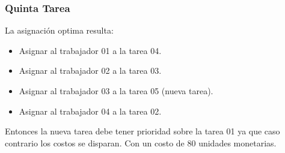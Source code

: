 \begin{homeworkProblem}[-1][JoShop]
\subsubsection{Quinta Tarea}
La asignación optima resulta:
\begin{itemize}
    \item Asignar al trabajador 01 a la tarea 04.
    \item Asignar al trabajador 02 a la tarea 03.
    \item Asignar al trabajador 03 a la tarea 05 (nueva tarea).
    \item Asignar al trabajador 04 a la tarea 02.
\end{itemize}
Entonces la nueva tarea debe tener prioridad sobre la tarea 01 ya que caso contrario los costos se disparan. Con un costo de 80 unidades monetarias.
\end{homeworkProblem}


